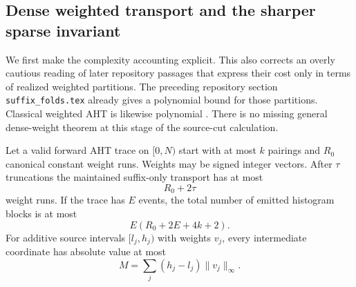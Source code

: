 \subsection{Dense weighted transport and the sharper sparse invariant}
\label{int:weights}

We first make the complexity accounting explicit.  This also corrects an
overly cautious reading of later repository passages that express their cost
only in terms of realized weighted partitions.  The preceding repository
section \texttt{suffix\_folds.tex} already gives a polynomial bound for those
partitions.  Classical weighted AHT is likewise polynomial
\cite[Theorem~16]{AHT2006}.  There is no missing general dense-weight theorem
at this stage of the source-cut calculation.

\begin{lemma}
\label{int:dense}
Let a valid forward AHT trace on $[0,N)$ start with at most $k$ pairings and
$R_0$ canonical constant weight runs.  Weights may be signed integer vectors.
After $\tau$ truncations the maintained suffix-only transport has at most
\[
                         R_0+2\tau
\]
weight runs.  If the trace has $E$ events, the total number of emitted
histogram blocks is at most
\[
                       E(R_0+2E+4k+2).
\]
For additive source intervals $[l_j,h_j)$ with weights $v_j$, every
intermediate coordinate has absolute value at most
\[
                  M=\sum_j(h_j-l_j)\lVert v_j\rVert_\infty.
\]
\end{lemma}

